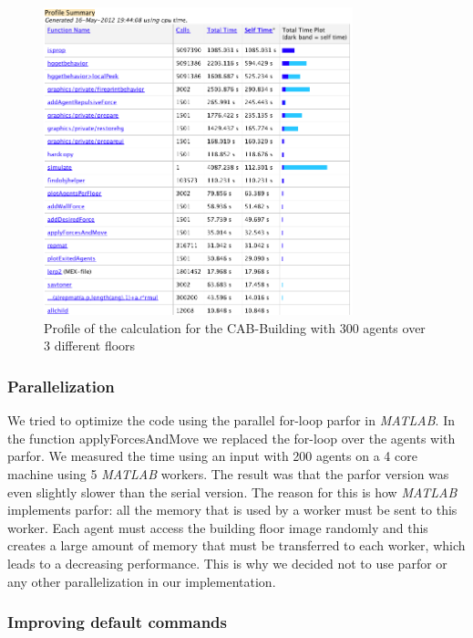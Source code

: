 \documentclass[11pt]{article}
\begin{document}
\begin{figure}[h]
\centering
\includegraphics[width=0.8\textwidth]{./images/profiler.png}
\caption{Profile of the calculation for the CAB-Building with 300 agents over 3 different floors} 
\label{cab profile}
\end{figure}


\subsubsection{Parallelization}

We tried to optimize the code using the parallel for-loop parfor in \textit{MATLAB}. In
the function applyForcesAndMove we replaced the for-loop over the agents with
parfor. We measured the time using an input with 200 agents on a 4 core machine
using 5 \textit{MATLAB} workers. The result was that the parfor version was even slightly
slower than the serial version. The reason for this is how \textit{MATLAB} implements
parfor: all the memory that is used by a worker must be sent to this worker.
Each agent must access the building floor image randomly and this creates a
large amount of memory that must be transferred to each worker, which leads to a
decreasing performance.
This is why we decided not to use parfor or any other parallelization in our
implementation.

\subsubsection{Improving default commands}
\end{document}
